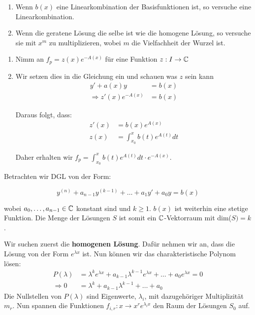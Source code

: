 \begin{enumerate}[label=(\arabic*)]
    \item Wenn $b(x)$ eine Linearkombination der Basisfunktionen ist, so versuche eine Linearkombination.
    \item Wenn die geratene Lösung die selbe ist wie die homogene Lösung, so versuche sie mit $x^m$ zu 
    multiplizieren, wobei $m$ die Vielfachheit der Wurzel ist.
\end{enumerate}



\begin{enumerate}[label=(\arabic*)]
  \item Nimm an $f_p = z(x) e^{-A(x)}$ für eine Funktion $z: I \to \mathbb{C}$
  \item Wir setzen dies in die Gleichung ein und schauen was $z$ sein kann
  \begin{align*}
    y' + a(x)y &= b(x)\\
    \Rightarrow z'(x) e^{-A(x)} &= b(x)
  \end{align*}
  
  Daraus folgt, dass: 
  \begin{align*}
    z'(x) &= b(x) e^{A(x)}\\
    z(x) &= \int_{x_0}^x b(t)e^{A(t)}dt 
  \end{align*}
 
  Daher erhalten wir $f_p = \int_{x_0}^x b(t)e^{A(t)}dt  \cdot e^{-A(x)}$.
\end{enumerate}



Betrachten wir DGL von der Form:

$$y^{(n)} + a_{n-1}y^{(k-1)} + \dots + a_1y' + a_0y = b(x)$$

wobei $a_0, \dots, a_{n-1} \in \mathbb{C}$ konstant sind und $k \geq 1$. $b(x)$ ist weiterhin eine stetige Funktion.
Die Menge der Lösungen $S$ ist somit ein $\mathbb{C}$-Vektorraum mit dim($S) = k$. \medskip

Wir suchen zuerst die \textbf{homogenen Lösung}. Dafür nehmen wir an, dass die Lösung von der Form 
$e^{\lambda x}$ ist. Nun können wir das charakteristische Polynom lösen:
\begin{align*}
  P(\lambda) &= \lambda^k e^{\lambda x} + a_{k-1} \lambda^{k-1} e^{\lambda x} + \dots + a_0 e^{\lambda x} = 0\\
  \Rightarrow 0 &= \lambda^k + a_{k-1}\lambda^{k-1} + \dots + a_0
\end{align*}
Die Nullstellen von $P(\lambda)$ sind Eigenwerte, $\lambda_i$, mit dazugehöriger Multiplizität  $m_r$. Nun spannen
die Funktionen $f_{i,r} : x \to x^r e^{\lambda_i x}$ den Raum der Lösungen $S_0$ auf. \medskip

